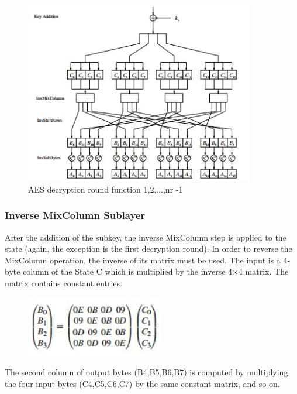 \documentclass[../main.tex]{subfiles}
\begin{document}
\begin{figure}[h]
\centering
\includegraphics[width=10cm]{diagrams/cryp16.jpg}

\caption{AES decryption round function 1,2,...,nr -1}
\label{fig:cryp16}
\end{figure}

\subsubsection{Inverse MixColumn Sublayer}
After the addition of the subkey, the inverse MixColumn step is applied to the state
(again, the exception is the first decryption round). In order to reverse the MixColumn operation, the inverse of its matrix must be used. The input is a 4-byte column
of the State C which is multiplied by the inverse 4×4 matrix. The matrix contains
constant entries. 
\begin{figure}[h]
\centering
\includegraphics[width=6cm]{diagrams/cryp17.jpg}
\end{figure}

The second column of output bytes (B4,B5,B6,B7) is computed by multiplying the
four input bytes (C4,C5,C6,C7) by the same constant matrix, and so on.
\end{document}
